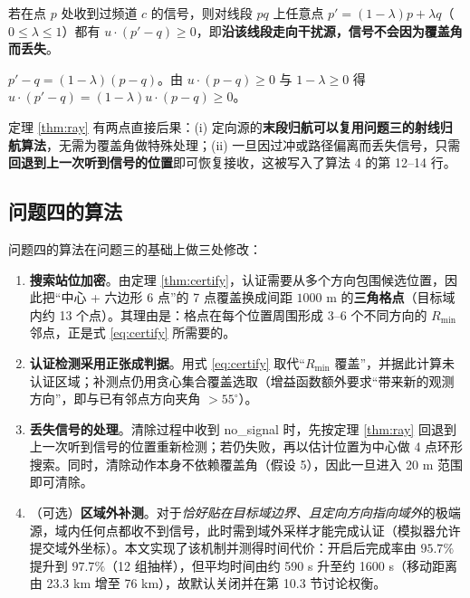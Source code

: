 \begin{theorem}[射线逼近引理]\label{thm:ray}
若在点 $p$ 处收到过频道 $c$ 的信号，则对线段 $pq$ 上任意点 $p'=(1-\lambda)p+\lambda q$（$0\le\lambda\le1$）都有 $u\cdot(p'-q)\ge0$，即\textbf{沿该线段走向干扰源，信号不会因为覆盖角而丢失}。
\end{theorem}
\begin{pf}
$p'-q=(1-\lambda)(p-q)$。由 $u\cdot(p-q)\ge0$ 与 $1-\lambda\ge0$ 得 $u\cdot(p'-q)=(1-\lambda)u\cdot(p-q)\ge0$。
\end{pf}

定理 \ref{thm:ray} 有两点直接后果：(i) 定向源的\textbf{末段归航可以复用问题三的射线归航算法}，无需为覆盖角做特殊处理；(ii) 一旦因过冲或路径偏离而丢失信号，只需\textbf{回退到上一次听到信号的位置}即可恢复接收，这被写入了算法 4 的第 12--14 行。

\subsection{问题四的算法}

问题四的算法在问题三的基础上做三处修改：

\begin{enumerate}
  \item \textbf{搜索站位加密}。由定理 \ref{thm:certify}，认证需要从多个方向包围候选位置，因此把“中心 + 六边形 6 点”的 7 点覆盖换成间距 $1000$ m 的\textbf{三角格点}（目标域内约 13 个点）。其理由是：格点在每个位置周围形成 3--6 个不同方向的 $R_{\min}$ 邻点，正是式 \eqref{eq:certify} 所需要的。
  \item \textbf{认证检测采用正张成判据}。用式 \eqref{eq:certify} 取代“$R_{\min}$ 覆盖”，并据此计算未认证区域；补测点仍用贪心集合覆盖选取（增益函数额外要求“带来新的观测方向”，即与已有邻点方向夹角 $>55^{\circ}$）。
  \item \textbf{丢失信号的处理}。清除过程中收到 no\_signal 时，先按定理 \ref{thm:ray} 回退到上一次听到信号的位置重新检测；若仍失败，再以估计位置为中心做 4 点环形搜索。同时，清除动作本身不依赖覆盖角（假设 5），因此一旦进入 20 m 范围即可清除。
  \item （可选）\textbf{区域外补测}。对于\emph{恰好贴在目标域边界、且定向方向指向域外}的极端源，域内任何点都收不到信号，此时需到域外采样才能完成认证（模拟器允许提交域外坐标）。本文实现了该机制并测得时间代价：开启后完成率由 $95.7\%$ 提升到 $97.7\%$（12 组抽样），但平均时间由约 590 s 升至约 1600 s（移动距离由 23.3 km 增至 76 km），故默认关闭并在第 10.3 节讨论权衡。
\end{enumerate}

